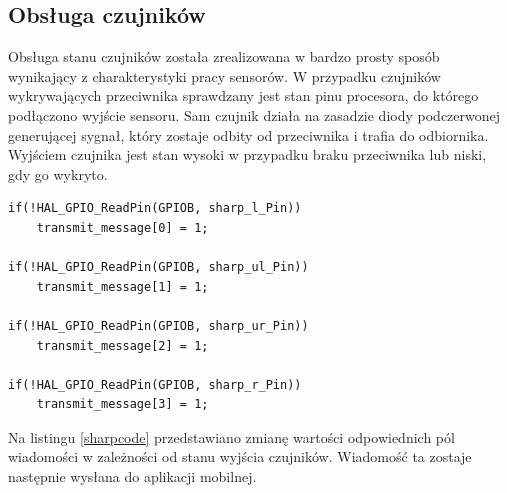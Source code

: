 \subsection{Obsługa czujników}
Obsługa stanu czujników została zrealizowana w bardzo prosty sposób wynikający z charakterystyki pracy sensorów. W przypadku czujników wykrywających przeciwnika sprawdzany jest stan pinu procesora, do którego podłączono wyjście sensoru. Sam czujnik działa na zasadzie diody podczerwonej generującej sygnał, który zostaje odbity od przeciwnika i trafia do odbiornika. Wyjściem czujnika jest stan wysoki w przypadku braku przeciwnika lub niski, gdy go wykryto.

\begin{minipage}{\textwidth}
	\begin{lstlisting}[label=sharpcode,caption=Obsługa czujników przeciwnika.]
if(!HAL_GPIO_ReadPin(GPIOB, sharp_l_Pin))
	transmit_message[0] = 1;

if(!HAL_GPIO_ReadPin(GPIOB, sharp_ul_Pin))
	transmit_message[1] = 1;

if(!HAL_GPIO_ReadPin(GPIOB, sharp_ur_Pin))
	transmit_message[2] = 1;

if(!HAL_GPIO_ReadPin(GPIOB, sharp_r_Pin))
	transmit_message[3] = 1;
	\end{lstlisting}
\end{minipage}

Na listingu \ref{sharpcode} przedstawiano zmianę wartości odpowiednich pól wiadomości w zależności od stanu wyjścia czujników. Wiadomość ta zostaje następnie wysłana do aplikacji mobilnej. 